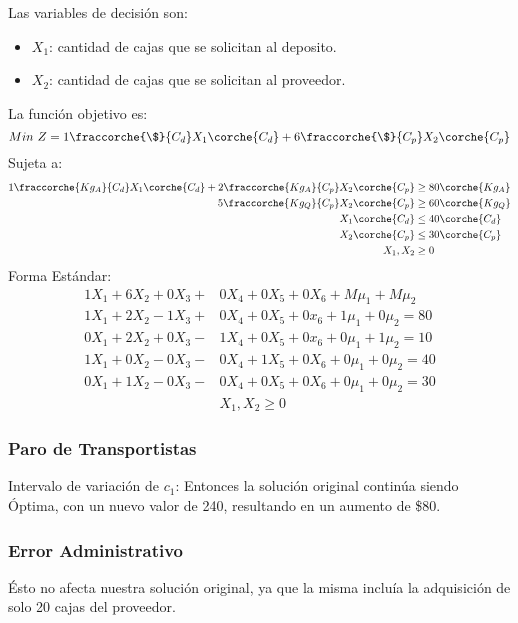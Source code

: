
\begin{homeworkProblem}
Las variables de decisión son:
\begin{itemize}
	\item $X_1$: cantidad de cajas que se solicitan al deposito.
	\item $X_2$: cantidad de cajas  que se solicitan al proveedor. 
\end{itemize}
La función objetivo es: 
\begin{equation}
	Min\ Z = 1\fraccorche{\$}{C_d}X_1\corche{C_d} + 6\fraccorche{\$}{C_p}X_2\corche{C_p}
\end{equation}
Sujeta a:
\begin{align*}
	1\fraccorche{Kg_A}{C_d}X_1\corche{C_d} + 2\fraccorche{Kg_A}{C_p}X_2\corche{C_p} &\ge 80 \corche{Kg_A}\\
	5\fraccorche{Kg_Q}{C_p}X_2\corche{C_p} &\ge 60 \corche{Kg_Q} \\
	X_1\corche{C_d} &\le 40\corche{C_d} \\
	X_2\corche{C_p} &\le 30 \corche{C_p} \\
	X_1,X_2 &\ge 0
\end{align*}
Forma Estándar:
\begin{align*}
	1X_1 + 6X_2 + 0X_3 + &0X_4 + 0X_5 + 0X_6 + M\mu_1 + M\mu_2 \\
	1X_1 + 2X_2 - 1X_3 +&0X_4 +0X_5 + 0x_6 + 1\mu_1 + 0\mu_2 = 80 \\
	0X_1 + 2X_2 + 0X_3 -&1X_4 +0X_5 + 0x_6 + 0\mu_1 + 1\mu_2 = 10 \\
	1X_1 + 0X_2 - 0X_3 -&0X_4 + 1X_5 + 0X_6 + 0\mu_1 + 0\mu_2 = 40 \\
	0X_1 + 1X_2 - 0X_3 -&0X_4 + 0X_5 + 0X_6 + 0\mu_1 + 0\mu_2 = 30 \\
	&X_1,X_2 \ge 0
\end{align*}
\subsubsection{Paro de Transportistas}
Intervalo de variación de $c_1$:
Entonces la solución original continúa siendo Óptima, con un nuevo valor de 240, resultando en un aumento de \$80.
\subsubsection{Error Administrativo}
Ésto no afecta nuestra solución original, ya que la misma incluía la adquisición de solo 20 cajas del proveedor.

\end{homeworkProblem}
